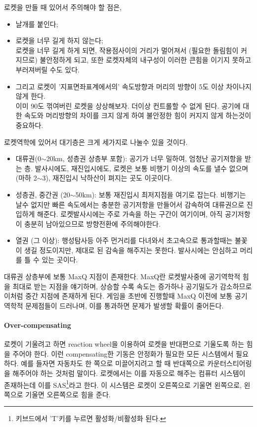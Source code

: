 \documentclass[9pt]{amsbook}
\begin{document}
로켓을 만들 때 있어서 주의해야 할 점은,
\begin{itemize}
\item 날개를 붙인다;
\item 로켓을 너무 길게 하지 않는다;
\\
로켓을 너무 길게 하게 되면, 작용점사이의 거리가 멀어져서 (필요한 돌림힘이 커지므로) 불안정하게 되고,
또한 로켓자체의 내구성이 이러한 큰힘을 이기지 못하고 부러져버릴 수도 있다.
\item 그리고 로켓이 '지표면좌표계에서의' 속도방향과 머리의 방향이 5도 이상 차이나지 않게 한다.
\\
이미 90도 꺾여버린 로켓을 상상해보자. 더이상 컨트롤할 수 없게 된다. 공기에 대한 속도와 머리방향의 차이를 크지 않게 하여 불안정한 힘이 커지지 않게 하는것이 중요하다.
\end{itemize}

로켓역학에 있어서 대기층은 크게 세가지로 나눌수 있을 것이다.
\begin{itemize}
\item 대류권(0$\sim$20km, 성층권 상층부 포함): 공기가 너무 밀하여, 엄청난 공기저항을 받는 층. 발사시에도, 재진입시에도, 로켓은 보통 비행기 이상의 속도를 낼수 없으며(마하 2$\sim$3), 재진입시 낙하산이 펴지는 곳도 이곳이다.
\item 성층권, 중간권 (20$\sim$50km): 보통 재진입시 최저지점을 여기로 잡는다. 비행기는 날수 없지만 빠른 속도에서는 충분한 공기저항을 만들어서 감속하여 대류권으로 진입하게 해준다. 로켓발사시에는 주로 가속을 하는 구간이 여기이며, 아직 공기저항이 충분히 남아있으므로 방향전환에 주의해야한다.
\item 열권 (그 이상): 행성탐사등 아주 먼거리를 다녀와서 초고속으로 통과할때는 불꽃이 생길 정도이지만, 제대로 된 감속을 해주지는 못한다. 발사시에는 안심하고 머리를 틀 수 있는 곳이다.
\end{itemize}
대류권 상층부에 보통 MaxQ 지점이 존재한다. MaxQ란 로켓발사중에 공기역학적 힘을 최대로 받는 지점을 얘기하며, 상승할 수록 속도는 증가하나 공기밀도가 감소하므로 이처럼 중간 지점에 존재하게 된다. 게임을 초반에 진행할때 MaxQ 이전에 보통 공기역학적 문제점들이 드러나며, 이를 통과하면 문제가 발생할 확률이 줄어든다.

\paragraph{Over-compensating}
로켓이 기울려고 하면 reaction wheel을 이용하여 로켓을 반대편으로 기울도록 하는 힘을 주어야 한다. 
이런 compensating한 기동은 안정화가 필요한 모든 시스템에서 필요하다. 
예를 들자면 자동차도 한 쪽으로 미끌어지려고 할 때 반대쪽으로 카운터스티어링을 해주어야 하는 것처럼 말이다. 
로켓에서는 이를 자동으로 해주는 컴퓨터 시스템이 존재하는데 이를 SAS\footnote{키브드에서 'T'키를 누르면 활성화/비활성화 된다.}라고 한다. 
이 시스템은 로켓이 오른쪽으로 기울면 왼쪽으로, 왼쪽으로 기울면 오른쪽으로 힘을 준다.
\end{document}
